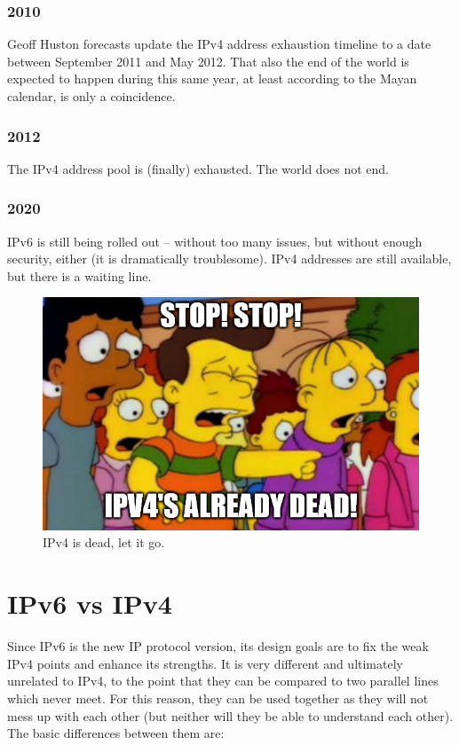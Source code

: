 
\subsubsection*{2010}
Geoff Huston forecasts update the IPv4 address exhaustion timeline to a date between September 2011 and May 2012. That also the end of the world is expected to happen during this same year, at least according to the Mayan calendar, is only a coincidence.


\subsubsection*{2012}
The IPv4 address pool is (finally) exhausted. The world does not end.


\subsubsection*{2020}
IPv6 is still being rolled out – without too many issues, but without enough security, either (it is dramatically troublesome). IPv4 addresses are still available, but there is a waiting line.

\begin{figure}[h]
    \centering
    \includegraphics[scale=0.5]{img/ipv4_dead_meme.png}
    \decoRule
    \caption{IPv4 is dead, let it go.}
    \label{fig:ipv4_dead}
\end{figure}



\section{IPv6 vs IPv4}
Since IPv6 is the new IP protocol version, its design goals are to fix the weak IPv4 points and enhance its strengths. It is very different and ultimately unrelated to IPv4, to the point that they can be compared to two parallel lines which never meet. For this reason, they can be used together as they will not mess up with each other (but neither will they be able to understand each other). The basic differences between them are:

